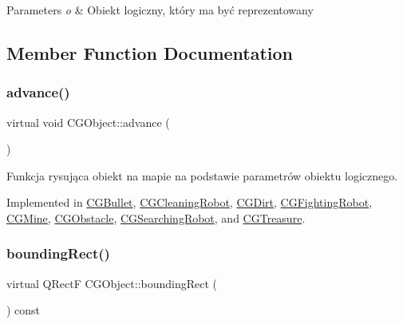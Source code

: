 \begin{DoxyParams}{Parameters}
{\em o} & Obiekt logiczny, który ma być reprezentowany \\
\hline
\end{DoxyParams}


\subsection{Member Function Documentation}
\mbox{\label{class_c_g_object_a859e765fbb3ab0d6ad73ca58e5e49779}} 
\subsubsection{\texorpdfstring{advance()}{advance()}}
{\footnotesize\ttfamily virtual void C\+G\+Object\+::advance (\begin{DoxyParamCaption}{ }\end{DoxyParamCaption})\hspace{0.3cm}{\ttfamily [pure virtual]}}



Funkcja rysująca obiekt na mapie na podstawie parametrów obiektu logicznego. 



Implemented in \mbox{\hyperlink{class_c_g_bullet_a3f1f31f6225a94b09ea8493e5b2040a8}{C\+G\+Bullet}}, \mbox{\hyperlink{class_c_g_cleaning_robot_a96511d40b48a6ac5a2fa31f2ed1f24e7}{C\+G\+Cleaning\+Robot}}, \mbox{\hyperlink{class_c_g_dirt_a871068d11fec47d09635b8992b11f7c9}{C\+G\+Dirt}}, \mbox{\hyperlink{class_c_g_fighting_robot_aee1cbe4ebdf24953ff3a9def4338c283}{C\+G\+Fighting\+Robot}}, \mbox{\hyperlink{class_c_g_mine_a6dbd841b39f421054cd8db54c3c84b74}{C\+G\+Mine}}, \mbox{\hyperlink{class_c_g_obstacle_adeb38e94e73f2c3d5d84afbb5e5e0fe7}{C\+G\+Obstacle}}, \mbox{\hyperlink{class_c_g_searching_robot_adcc4b3096e11c25287806428119acb22}{C\+G\+Searching\+Robot}}, and \mbox{\hyperlink{class_c_g_treasure_a4b8a13bcae320e63a87a32a804606190}{C\+G\+Treasure}}.

\mbox{\label{class_c_g_object_ab9edf3d10a53c254cdb5d3d8de930207}} 
\subsubsection{\texorpdfstring{bounding\+Rect()}{boundingRect()}}
{\footnotesize\ttfamily virtual Q\+RectF C\+G\+Object\+::bounding\+Rect (\begin{DoxyParamCaption}{ }\end{DoxyParamCaption}) const\hspace{0.3cm}{\ttfamily [pure virtual]}}



